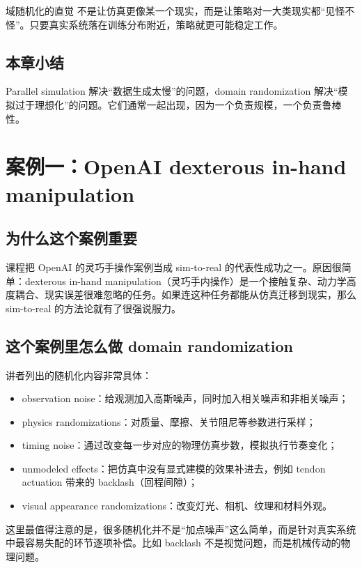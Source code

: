 \documentclass[a4paper]{article}
\begin{document}
\begin{knowledgebox}{域随机化的直觉}
不是让仿真更像某一个现实，而是让策略对一大类现实都“见怪不怪”。只要真实系统落在训练分布附近，策略就更可能稳定工作。
\end{knowledgebox}

\subsection{本章小结}

Parallel simulation 解决“数据生成太慢”的问题，domain randomization 解决“模拟过于理想化”的问题。它们通常一起出现，因为一个负责规模，一个负责鲁棒性。

\section{案例一：OpenAI dexterous in-hand manipulation}

\subsection{为什么这个案例重要}

课程把 OpenAI 的灵巧手操作案例当成 sim-to-real 的代表性成功之一。原因很简单：dexterous in-hand manipulation（灵巧手内操作）是一个接触复杂、动力学高度耦合、现实误差很难忽略的任务。如果连这种任务都能从仿真迁移到现实，那么 sim-to-real 的方法论就有了很强说服力。

\subsection{这个案例里怎么做 domain randomization}

讲者列出的随机化内容非常具体：
\begin{itemize}
  \item observation noise：给观测加入高斯噪声，同时加入相关噪声和非相关噪声；
  \item physics randomizations：对质量、摩擦、关节阻尼等参数进行采样；
  \item timing noise：通过改变每一步对应的物理仿真步数，模拟执行节奏变化；
  \item unmodeled effects：把仿真中没有显式建模的效果补进去，例如 tendon actuation 带来的 backlash（回程间隙）；
  \item visual appearance randomizations：改变灯光、相机、纹理和材料外观。
\end{itemize}

这里最值得注意的是，很多随机化并不是“加点噪声”这么简单，而是针对真实系统中最容易失配的环节逐项补偿。比如 backlash 不是视觉问题，而是机械传动的物理问题。
\end{document}
